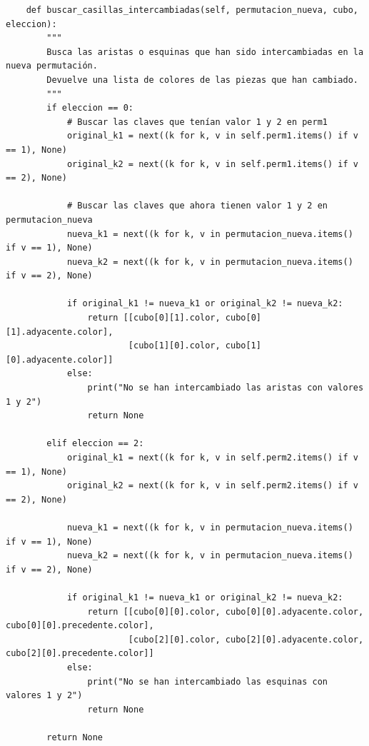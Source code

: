 \begin{lstlisting}
    def buscar_casillas_intercambiadas(self, permutacion_nueva, cubo, eleccion):
        """
        Busca las aristas o esquinas que han sido intercambiadas en la nueva permutación.
        Devuelve una lista de colores de las piezas que han cambiado.
        """
        if eleccion == 0:
            # Buscar las claves que tenían valor 1 y 2 en perm1
            original_k1 = next((k for k, v in self.perm1.items() if v == 1), None)
            original_k2 = next((k for k, v in self.perm1.items() if v == 2), None)

            # Buscar las claves que ahora tienen valor 1 y 2 en permutacion_nueva
            nueva_k1 = next((k for k, v in permutacion_nueva.items() if v == 1), None)
            nueva_k2 = next((k for k, v in permutacion_nueva.items() if v == 2), None)

            if original_k1 != nueva_k1 or original_k2 != nueva_k2:
                return [[cubo[0][1].color, cubo[0][1].adyacente.color],
                        [cubo[1][0].color, cubo[1][0].adyacente.color]]
            else:
                print("No se han intercambiado las aristas con valores 1 y 2")
                return None

        elif eleccion == 2:
            original_k1 = next((k for k, v in self.perm2.items() if v == 1), None)
            original_k2 = next((k for k, v in self.perm2.items() if v == 2), None)

            nueva_k1 = next((k for k, v in permutacion_nueva.items() if v == 1), None)
            nueva_k2 = next((k for k, v in permutacion_nueva.items() if v == 2), None)

            if original_k1 != nueva_k1 or original_k2 != nueva_k2:
                return [[cubo[0][0].color, cubo[0][0].adyacente.color, cubo[0][0].precedente.color],
                        [cubo[2][0].color, cubo[2][0].adyacente.color, cubo[2][0].precedente.color]]
            else:
                print("No se han intercambiado las esquinas con valores 1 y 2")
                return None

        return None
        

\end{lstlisting}